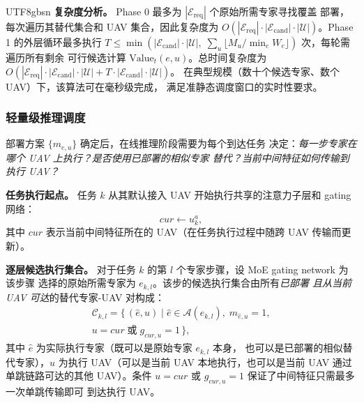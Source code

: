 \documentclass[conference]{IEEEtran}
\begin{document}
\begin{CJK*}{UTF8}{gbsn}
\textbf{复杂度分析。}
Phase 0 最多为 $|\mathcal{E}_{\mathrm{req}}|$ 个原始所需专家寻找覆盖
部署，每次遍历其替代集合和 UAV 集合，因此复杂度为
$O(|\mathcal{E}_{\mathrm{req}}|\cdot|\mathcal{E}_{\mathrm{cand}}|
\cdot|\mathcal{U}|)$。Phase 1 的外层循环最多执行
$T \le \min(|\mathcal{E}_{\mathrm{cand}}|\cdot|\mathcal{U}|,\;
\sum_u \lfloor M_u / \min_e W_e\rfloor)$ 次，每轮需遍历所有剩余
可行候选计算 $\mathrm{Value}_t(e,u)$。总时间复杂度为
$O(|\mathcal{E}_{\mathrm{req}}|\cdot|\mathcal{E}_{\mathrm{cand}}|
\cdot|\mathcal{U}|+
T\cdot|\mathcal{E}_{\mathrm{cand}}|\cdot|\mathcal{U}|)$。
在典型规模（数十个候选专家、数个 UAV）下，该算法可在毫秒级完成，
满足准静态调度窗口的实时性要求。

\subsubsection{轻量级推理调度}
\label{sec:inference_scheduling}

部署方案 $\{m_{e,u}\}$ 确定后，在线推理阶段需要为每个到达任务
决定：\emph{每一步专家在哪个 UAV 上执行？是否使用已部署的相似专家
替代？当前中间特征如何传输到执行 UAV？}

\textbf{任务执行起点。}
任务 $k$ 从其默认接入 UAV 开始执行共享的注意力子层和 gating 网络：
\begin{equation}
cur \leftarrow u_k^a,
\label{eq:cur_init}
\end{equation}
其中 $cur$ 表示当前中间特征所在的 UAV（在任务执行过程中随跨 UAV
传输而更新）。

\textbf{逐层候选执行集合。}
对于任务 $k$ 的第 $l$ 个专家步骤，设 MoE gating network 为该步骤
选择的原始所需专家为 $e_{k,l}$。该步的候选执行集合由所有\emph{已部署
且从当前 UAV 可达}的替代专家-UAV 对构成：
\begin{multline}
\mathcal{C}_{k,l} = \{\,(\hat{e}, u) \mid
\hat{e} \in \mathcal{A}(e_{k,l}),\;
m_{\hat{e},u} = 1,\\[2pt]
u = cur \;\text{或}\; g_{cur,u} = 1\,\},
\label{eq:candidate_exec}
\end{multline}
其中 $\hat{e}$ 为实际执行专家（既可以是原始专家 $e_{k,l}$ 本身，
也可以是已部署的相似替代专家），$u$ 为执行 UAV（可以是当前 UAV
本地执行，也可以是当前 UAV 通过单跳链路可达的其他 UAV）。条件
$u=cur$ 或 $g_{cur,u}=1$ 保证了中间特征只需最多一次单跳传输即可
到达执行 UAV。


\end{CJK*}
\end{document}
